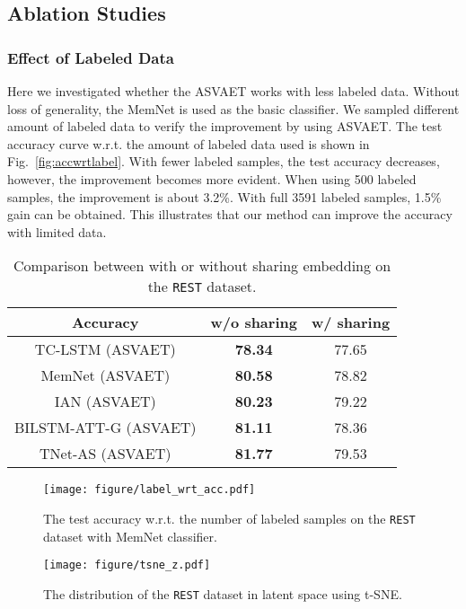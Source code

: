 \documentclass[11pt,a4paper]{article}
\begin{document}
\subsection{Ablation Studies}
\subsubsection{Effect of Labeled Data}
Here we investigated whether the ASVAET works with less labeled data.
Without loss of generality,  the MemNet is used as the basic classifier.
We sampled different amount of labeled data to verify the improvement by using ASVAET.
The test accuracy curve w.r.t. the amount of labeled data used is shown in Fig.~\ref{fig:accwrtlabel}.
With fewer labeled samples, the test accuracy decreases, however, the improvement becomes more evident.
When using 500 labeled samples, the improvement is about 3.2\%.
With full 3591 labeled samples, 1.5\% gain can be obtained.
This illustrates that our method can improve the accuracy with limited data.

\begin{table}
	\small
	\centering
	\begin{tabular}{c c c}
		\toprule
		Accuracy  & w/o sharing & w/ sharing \\
		\hline
		TC-LSTM (ASVAET) & \textbf{78.34} & 77.65 \\
		MemNet (ASVAET) & \textbf{80.58} & 78.82 \\
		IAN (ASVAET) & \textbf{80.23} & 79.22\\
		BILSTM-ATT-G (ASVAET) & \textbf{81.11} & 78.36 \\
		TNet-AS (ASVAET) & \textbf{81.77} & 79.53 \\
		\toprule
	\end{tabular}
	\caption{Comparison between with or without sharing embedding on the \texttt{REST} dataset.}\label{tab:emb}
\end{table}


\begin{figure}
\centering
	\texttt{[image: figure/label\_wrt\_acc.pdf]}
	\caption{The test accuracy w.r.t. the number of labeled samples on the \texttt{REST} dataset with MemNet classifier.}\label{fig:accwrtlabel}
\centering
	\texttt{[image: figure/tsne\_z.pdf]}
	\caption{The distribution of the \texttt{REST} dataset in latent space  using t-SNE.}\label{fig:tsne}
\end{figure}
\end{document}
